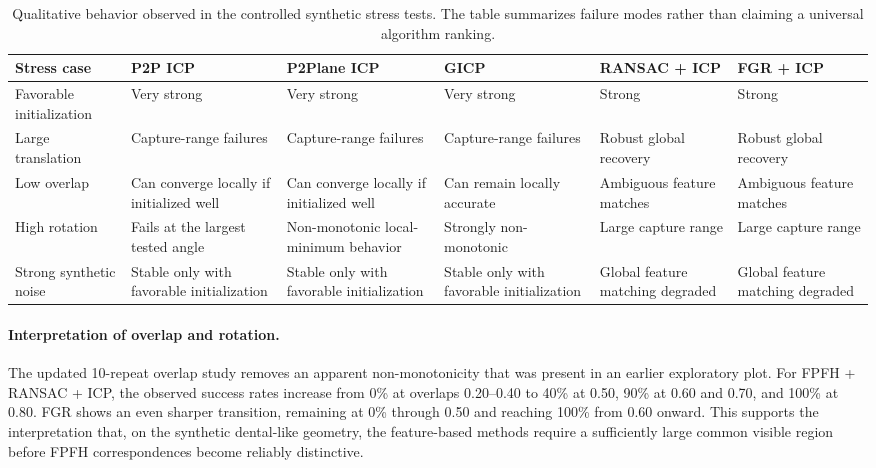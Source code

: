 \begin{table}[!t]
\centering
\footnotesize
\setlength{\tabcolsep}{4pt}
\begin{tabularx}{\textwidth}{@{}lYYYYY@{}}
\toprule
\textbf{Stress case} & \textbf{P2P ICP} & \textbf{P2Plane ICP} & \textbf{GICP} & \textbf{RANSAC + ICP} & \textbf{FGR + ICP} \\
\midrule
Favorable initialization & Very strong & Very strong & Very strong & Strong & Strong \\
Large translation & Capture-range failures & Capture-range failures & Capture-range failures & Robust global recovery & Robust global recovery \\
Low overlap & Can converge locally if initialized well & Can converge locally if initialized well & Can remain locally accurate & Ambiguous feature matches & Ambiguous feature matches \\
High rotation & Fails at the largest tested angle & Non-monotonic local-minimum behavior & Strongly non-monotonic & Large capture range & Large capture range \\
Strong synthetic noise & Stable only with favorable initialization & Stable only with favorable initialization & Stable only with favorable initialization & Global feature matching degraded & Global feature matching degraded \\
\bottomrule
\end{tabularx}
\caption{Qualitative behavior observed in the controlled synthetic stress tests. The table summarizes failure modes rather than claiming a universal algorithm ranking.}
\label{tab:synthetic-behavior-summary}
\end{table}

\paragraph{Interpretation of overlap and rotation.}
The updated 10-repeat overlap study removes an apparent non-monotonicity that was present in an earlier exploratory plot. For FPFH + RANSAC + ICP, the observed success rates increase from 0\% at overlaps 0.20--0.40 to 40\% at 0.50, 90\% at 0.60 and 0.70, and 100\% at 0.80. FGR shows an even sharper transition, remaining at 0\% through 0.50 and reaching 100\% from 0.60 onward. This supports the interpretation that, on the synthetic dental-like geometry, the feature-based methods require a sufficiently large common visible region before FPFH correspondences become reliably distinctive.

